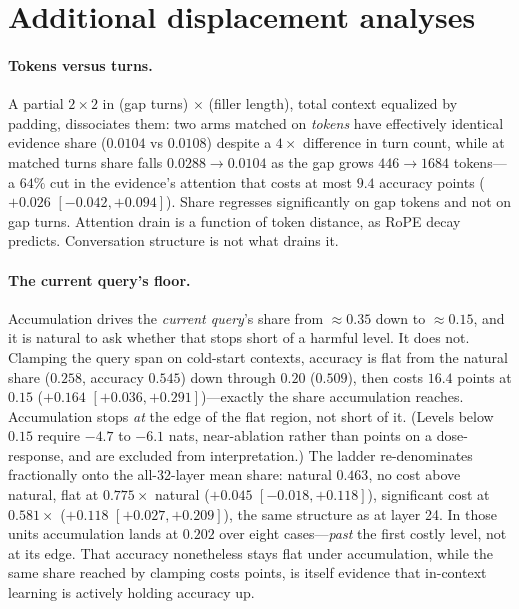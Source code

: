 \documentclass{article}
\begin{document}
\section{Additional displacement analyses}
\label{app:displacement-detail}

\paragraph{Tokens versus turns.}
A partial $2{\times}2$ in (gap turns) $\times$ (filler length), total context equalized by
padding, dissociates them: two arms matched on \emph{tokens} have effectively identical evidence
share ($0.0104$ vs $0.0108$) despite a $4\times$ difference in turn count, while at matched
turns share falls $0.0288\to0.0104$ as the gap grows $446\to1684$ tokens---a $64\%$ cut in the
evidence's attention that costs at most $9.4$ accuracy points ($+0.026$ $[-0.042,+0.094]$).
Share regresses significantly on gap tokens and not on gap turns. Attention drain is a function
of token distance, as RoPE decay predicts. Conversation structure is not what drains it.

\paragraph{The current query's floor.}
Accumulation drives the \emph{current query}'s share from ${\approx}0.35$ down to
${\approx}0.15$, and it is natural to ask whether that stops short of a harmful level. It does
not. Clamping the query span on cold-start contexts, accuracy is flat from the natural share
($0.258$, accuracy $0.545$) down through $0.20$ ($0.509$), then costs $16.4$ points at $0.15$
($+0.164$ $[+0.036,+0.291]$)---exactly the share accumulation reaches. Accumulation stops
\emph{at} the edge of the flat region, not short of it. (Levels below $0.15$ require $-4.7$ to
$-6.1$ nats, near-ablation rather than points on a dose-response, and are excluded from
interpretation.) The ladder re-denominates fractionally onto the all-32-layer mean share:
natural $0.463$, no cost above natural, flat at $0.775\times$ natural ($+0.045$
$[-0.018,+0.118]$), significant cost at $0.581\times$ ($+0.118$ $[+0.027,+0.209]$), the same
structure as at layer 24. In those units accumulation lands at $0.202$ over eight
cases---\emph{past} the first costly level, not at its edge. That accuracy nonetheless stays
flat under accumulation, while the same share reached by clamping costs points, is itself
evidence that in-context learning is actively holding accuracy up.
\end{document}
